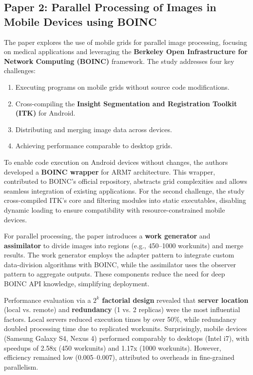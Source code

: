 \documentclass[conference]{IEEEtran}
\begin{document}
\subsection{Paper 2: Parallel Processing of Images in Mobile Devices using BOINC}

The paper explores the use of mobile grids for parallel image processing, focusing on medical applications and leveraging the \textbf{Berkeley Open Infrastructure for Network Computing (BOINC)} framework. The study addresses four key challenges:

\begin{enumerate}
    \item Executing programs on mobile grids without source code modifications.
    \item Cross-compiling the \textbf{Insight Segmentation and Registration Toolkit (ITK)} for Android.
    \item Distributing and merging image data across devices.
    \item Achieving performance comparable to desktop grids.
\end{enumerate}

To enable code execution on Android devices without changes, the authors developed a \textbf{BOINC wrapper} for ARM7 architecture. This wrapper, contributed to BOINC’s official repository, abstracts grid complexities and allows seamless integration of existing applications. For the second challenge, the study cross-compiled ITK’s core and filtering modules into static executables, disabling dynamic loading to ensure compatibility with resource-constrained mobile devices.

For parallel processing, the paper introduces a \textbf{work generator} and \textbf{assimilator} to divide images into regions (e.g., 450–1000 workunits) and merge results. The work generator employs the adapter pattern to integrate custom data-division algorithms with BOINC, while the assimilator uses the observer pattern to aggregate outputs. These components reduce the need for deep BOINC API knowledge, simplifying deployment.

Performance evaluation via a \textbf{$2^k$ factorial design} revealed that \textbf{server location} (local vs. remote) and \textbf{redundancy} (1 vs. 2 replicas) were the most influential factors. Local servers reduced execution times by over 50\%, while redundancy doubled processing time due to replicated workunits. Surprisingly, mobile devices (Samsung Galaxy S4, Nexus 4) performed comparably to desktops (Intel i7), with speedups of 2.58x (450 workunits) and 1.17x (1000 workunits). However, efficiency remained low (0.005–0.007), attributed to overheads in fine-grained parallelism.
\end{document}
